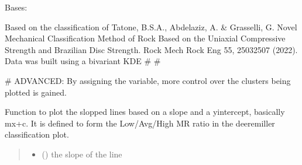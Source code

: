 \documentclass[letterpaper,10pt,english]{sphinxmanual}
\begin{document}
\begin{fulllineitems}
\label{\detokenize{pyrockmodulus:pyrockmodulus.pyrockmodulus.strength_ratio}}
\pysigstartsignatures
{}
\pysigstopsignatures
\sphinxAtStartPar
Bases: 

\sphinxAtStartPar
Based on the classification of Tatone, B.S.A., Abdelaziz, A. \& Grasselli, G. Novel Mechanical Classification Method of Rock Based on the Uniaxial Compressive Strength and Brazilian Disc Strength. Rock Mech Rock Eng 55, 2503\textendash{}2507 (2022). 
Data was built using a bivariant KDE
\# 
\# 

\sphinxAtStartPar
\# ADVANCED: By assigning the  variable, more control over the clusters being plotted is gained.

\begin{fulllineitems}
\label{\detokenize{pyrockmodulus:pyrockmodulus.pyrockmodulus.strength_ratio.abline}}
\pysigstartsignatures
{}
\pysigstopsignatures
\sphinxAtStartPar
Function to plot the slopped lines based on a slope and a y\sphinxhyphen{}intercept, basically mx+c. It is defined to form the Low/Avg/High MR ratio in the deere\sphinxhyphen{}miller classification plot.
\begin{quote}\begin{description}
\begin{itemize}
\item {} 
\sphinxAtStartPar
{} () \textendash{} the slope of the line


\end{itemize}
\end{description}
\end{quote}
\end{fulllineitems}
\end{fulllineitems}
\end{document}
